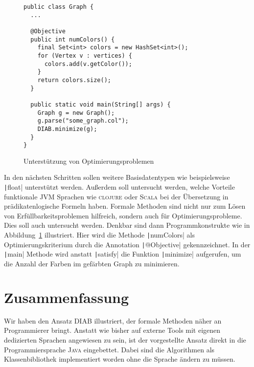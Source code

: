 \documentclass[a4paper,fontsize=12pt,headings=small,captions=tableheading,%
numbers=endperiod,abstracton,pdftex]{scrartcl}
\begin{document}
\begin{figure}[t]
  \centering
  \begin{verbatim}
public class Graph {
  ...

  @Objective
  public int numColors() {
    final Set<int> colors = new HashSet<int>();
    for (Vertex v : vertices) {
      colors.add(v.getColor());
    }
    return colors.size();
  }

  public static void main(String[] args) {
    Graph g = new Graph();
    g.parse("some_graph.col");
    DIAB.minimize(g);
  }
}
  \end{verbatim}
  \medskip
  \caption{Unterstützung von Optimierungsproblemen}
  \label{fig:optimization}
\end{figure}

In den nächsten Schritten sollen weitere Basisdatentypen wie beispielsweise
\texttt|float| unterstützt werden.  Außerdem soll untersucht werden,
welche Vorteile funktionale JVM Sprachen wie \textsc{clojure} oder
\textsc{Scala} bei der Übersetzung in prädikatenlogische Formeln haben.  Formale
Methoden sind nicht nur zum Lösen von Erfüllbarkeitsproblemen hilfreich, sondern
auch für Optimierungsprobleme.  Dies soll auch untersucht werden.  Denkbar sind
dann Programmkonstrukte wie in Abbildung~\ref{fig:optimization} illustriert.
Hier wird die Methode \texttt|numColors| als Optimierungskriterium
durch die Annotation \texttt|@Objective| gekennzeichnet.  In der
\texttt|main| Methode wird anstatt \texttt|satisfy| die
Funktion \texttt|minimize| aufgerufen, um die Anzahl der Farben im
gefärbten Graph zu minimieren.


\section{Zusammenfassung}
Wir haben den Ansatz \textsc{DIAB} illustriert, der formale Methoden näher an
Programmierer bringt.  Anstatt wie bisher auf externe Tools mit eigenen
dedizierten Sprachen angewiesen zu sein, ist der vorgestellte Ansatz direkt in
die Programmiersprache \textsc{Java} eingebettet.  Dabei sind die Algorithmen
als Klassenbibliothek implementiert worden ohne die Sprache ändern zu müssen.


\end{document}
